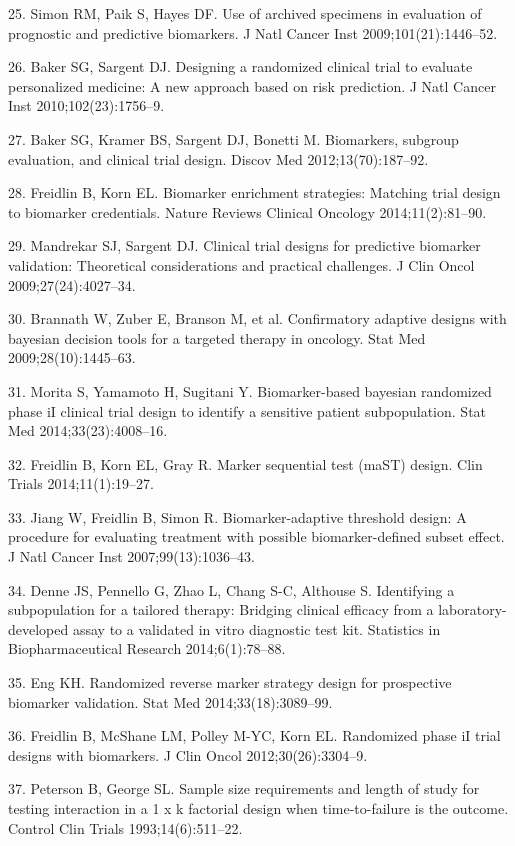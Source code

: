 \documentclass[11pt]{article}
\begin{document}
25. Simon RM, Paik S, Hayes DF. Use of archived specimens in evaluation
of prognostic and predictive biomarkers. J Natl Cancer Inst
2009;101(21):1446--52.

26. Baker SG, Sargent DJ. Designing a randomized clinical trial to
evaluate personalized medicine: A new approach based on risk prediction.
J Natl Cancer Inst 2010;102(23):1756--9.

27. Baker SG, Kramer BS, Sargent DJ, Bonetti M. Biomarkers, subgroup
evaluation, and clinical trial design. Discov Med 2012;13(70):187--92.

28. Freidlin B, Korn EL. Biomarker enrichment strategies: Matching trial
design to biomarker credentials. Nature Reviews Clinical Oncology
2014;11(2):81--90.

29. Mandrekar SJ, Sargent DJ. Clinical trial designs for predictive
biomarker validation: Theoretical considerations and practical
challenges. J Clin Oncol 2009;27(24):4027--34.

30. Brannath W, Zuber E, Branson M, et al. Confirmatory adaptive designs
with bayesian decision tools for a targeted therapy in oncology. Stat
Med 2009;28(10):1445--63.

31. Morita S, Yamamoto H, Sugitani Y. Biomarker-based bayesian
randomized phase iI clinical trial design to identify a sensitive
patient subpopulation. Stat Med 2014;33(23):4008--16.

32. Freidlin B, Korn EL, Gray R. Marker sequential test (maST) design.
Clin Trials 2014;11(1):19--27.

33. Jiang W, Freidlin B, Simon R. Biomarker-adaptive threshold design: A
procedure for evaluating treatment with possible biomarker-defined
subset effect. J Natl Cancer Inst 2007;99(13):1036--43.

34. Denne JS, Pennello G, Zhao L, Chang S-C, Althouse S. Identifying a
subpopulation for a tailored therapy: Bridging clinical efficacy from a
laboratory-developed assay to a validated in vitro diagnostic test kit.
Statistics in Biopharmaceutical Research 2014;6(1):78--88.

35. Eng KH. Randomized reverse marker strategy design for prospective
biomarker validation. Stat Med 2014;33(18):3089--99.

36. Freidlin B, McShane LM, Polley M-YC, Korn EL. Randomized phase iI
trial designs with biomarkers. J Clin Oncol 2012;30(26):3304--9.

37. Peterson B, George SL. Sample size requirements and length of study
for testing interaction in a 1 x k factorial design when time-to-failure
is the outcome. Control Clin Trials 1993;14(6):511--22.
\end{document}
